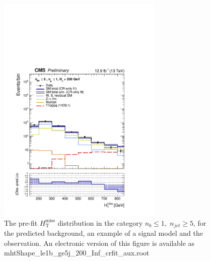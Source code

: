 \clearpage
\begin{figure}[tbhp]
    \caption{ 
    The pre-fit $H_{\mathrm{T}}^{\mathrm{miss}}$ distribution in the category $n_{b}\leq 1, \; n_{jet} \geq 5$, 
    for the predicted background, an example of a signal model and the observation.
    An electronic version of this figure is available as mhtShape\_le1b\_ge5j\_200\_Inf\_crfit\_aux.root
    \label{fig:mhtShape_le1b_ge5j_crfit} }
  \begin{center}
  \includegraphics[width=0.7\textwidth]{mhtShape_le1b_ge5j_200_Inf_crfit_aux}
  \end{center}
\end{figure}


